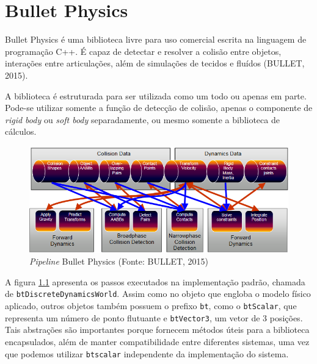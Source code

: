 \chapter{Bullet Physics}

Bullet Physics é uma biblioteca livre para uso comercial escrita na linguagem de programação C++. É capaz de detectar e resolver a colisão entre objetos, interações entre articulações, além de simulações de tecidos e fluídos (BULLET, 2015).

A biblioteca é estruturada para ser utilizada como um todo ou apenas em parte. Pode-se utilizar somente a função de detecção de colisão, apenas o componente de \textit{rigid body} ou \textit{soft body} separadamente, ou mesmo somente a biblioteca de cálculos.

\begin{figure}[H]
	\centering
	\includegraphics[scale=0.7]{imagens/bullet-pipeline.png}
	\caption{\small \textit{Pipeline} Bullet Physics (Fonte: BULLET, 2015)}
	\label{fig:bulletpipeline}
\end{figure}

A figura \ref{fig:bulletpipeline} apresenta os passos executados na implementação padrão, chamada de \lstinline{btDiscreteDynamicsWorld}. Assim como no objeto que engloba o modelo físico aplicado, outros objetos também possuem o prefixo \lstinline{bt}, como o \lstinline{btScalar}, que representa um número de ponto flutuante e \lstinline{btVector3}, um vetor de 3 posições. Tais abstrações são importantes porque fornecem métodos úteis para a biblioteca encapsulados, além de manter compatibilidade entre diferentes sistemas, uma vez que podemos utilizar  \lstinline{btscalar} independente da implementação do sistema.

